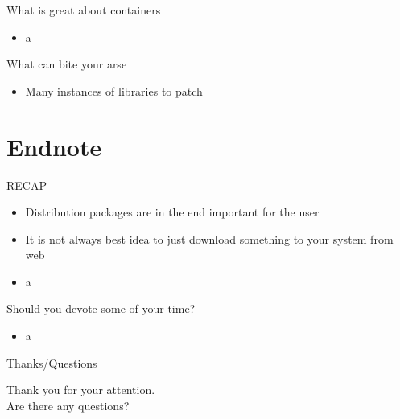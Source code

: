 \documentclass{beamer}
\begin{document}
\begin{frame}[t]{What is great about containers}
	\begin{itemize}
	\item a
	\end{itemize}
\end{frame}

\begin{frame}[t]{What can bite your arse}
	\begin{itemize}
	\item Many instances of libraries to patch
	\end{itemize}
\end{frame}

\section{Endnote}

\begin{frame}[t]{RECAP}
	\begin{itemize}
	\item Distribution packages are in the end important for the user
	\item It is not always best idea to just download something to your system from web
	\item a
	\end{itemize}
\end{frame}

\begin{frame}[t]{Should you devote some of your time?}
	\begin{itemize}
	\item a
	\end{itemize}
\end{frame}

\begin{frame}{Thanks/Questions}
	\begin{center}
	Thank you for your attention.\\
	Are there any questions?
	\end{center}
\end{frame}
\end{document}
